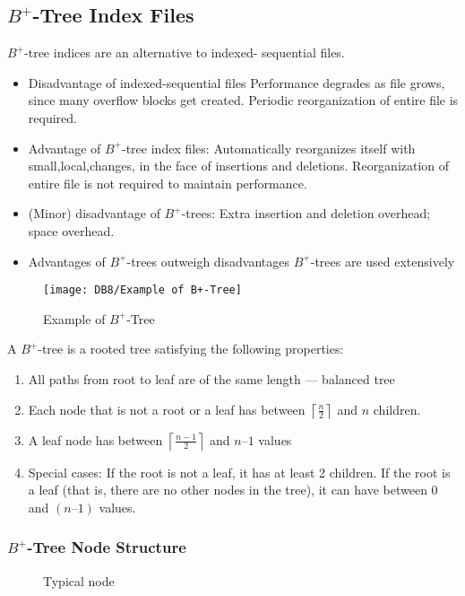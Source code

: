 \subsection{\texorpdfstring{$B^+$}.-Tree Index Files}
$B^+$-tree indices are an alternative to indexed- sequential files.
\begin{itemize}\small
    \item Disadvantage of indexed-sequential files
    \subitem Performance degrades as file grows, since many overflow blocks get created.
    \subitem Periodic reorganization of entire file is required.
    \item Advantage of $B^+$-tree index files:
    \subitem Automatically reorganizes itself with\\ small,local,changes, in the face of insertions and deletions.
    \subitem Reorganization of entire file is not required to maintain performance.
    \item (Minor) disadvantage of $B^+$-trees:
    \subitem Extra insertion and deletion overhead; space overhead.
    \item Advantages of $B^+$-trees outweigh disadvantages
    \subitem $B^+$-trees are used extensively
\end{itemize}

\begin{figure}[!htb]
    \centering
    \texttt{[image: DB8/Example of B+-Tree]}
    \caption{Example of $B^+$-Tree}
\end{figure}

A $B^+$-tree is a rooted tree satisfying the following properties: 
\begin{enumerate}\small
    \item All paths from root to leaf are of the same length –-- balanced tree
    \item Each node that is not a root or a leaf has between $\left\lceil \frac{n}{2} \right\rceil$ and $n$ children.
    \item A leaf node has between $\left\lceil \frac{n-1}{2} \right\rceil$ and $n–1$ values
    \item Special cases:
    \subitem If the root is not a leaf, it has at least 2 children.
    \subitem If the root is a leaf (that is, there are no other nodes in the tree), it can have between 0 and $(n–1)$ values.
\end{enumerate}

\subsubsection{\texorpdfstring{$B^+$}.-Tree Node Structure}
\begin{figure}[!htb]
    \centering
    \begin{tikzpicture}
        
    \end{tikzpicture}
    \caption{Typical node}
\end{figure}

